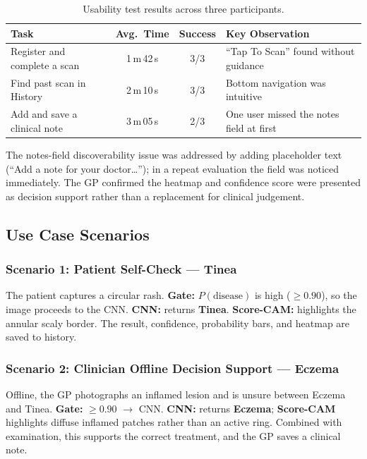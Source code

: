 \begin{table}[H]
\centering
\caption{Usability test results across three participants.}
\label{tab:usability}
\begin{tabular}{|l|c|c|p{5cm}|}
\hline
\textbf{Task} & \textbf{Avg.\ Time} & \textbf{Success} & \textbf{Key Observation} \\ \hline
Register and complete a scan & 1\,m\,42\,s & 3/3 & ``Tap To Scan'' found without guidance \\ \hline
Find past scan in History & 2\,m\,10\,s & 3/3 & Bottom navigation was intuitive \\ \hline
Add and save a clinical note & 3\,m\,05\,s & 2/3 & One user missed the notes field at first \\ \hline
\end{tabular}
\end{table}

\noindent The notes-field discoverability issue was addressed by adding
placeholder text (``Add a note for your doctor\ldots''); in a repeat evaluation
the field was noticed immediately. The GP confirmed the heatmap and confidence
score were presented as decision support rather than a replacement for clinical
judgement.

\subsection{Use Case Scenarios}

\subsubsection{Scenario 1: Patient Self-Check — Tinea}
The patient captures a circular rash. \textbf{Gate:} $P(\text{disease})$ is high
($\ge0.90$), so the image proceeds to the CNN. \textbf{CNN:} returns
\textbf{Tinea}. \textbf{Score-CAM:} highlights the annular scaly border. The
result, confidence, probability bars, and heatmap are saved to history.

\subsubsection{Scenario 2: Clinician Offline Decision Support — Eczema}
Offline, the GP photographs an inflamed lesion and is unsure between Eczema and
Tinea. \textbf{Gate:} $\ge0.90$ $\rightarrow$ CNN. \textbf{CNN:} returns
\textbf{Eczema}; \textbf{Score-CAM} highlights diffuse inflamed patches rather
than an active ring. Combined with examination, this supports the correct
treatment, and the GP saves a clinical note.

